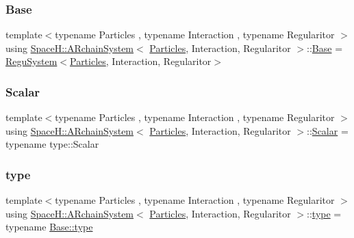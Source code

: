 \subsubsection{\texorpdfstring{Base}{Base}}
{\footnotesize\ttfamily template$<$typename Particles , typename Interaction , typename Regularitor $>$ \\
using \mbox{\hyperlink{class_space_h_1_1_a_rchain_system}{Space\+H\+::\+A\+Rchain\+System}}$<$ \mbox{\hyperlink{struct_space_h_1_1_particles}{Particles}}, Interaction, Regularitor $>$\+::\mbox{\hyperlink{class_space_h_1_1_a_rchain_system_a406ea4f9fd417879ac32c691bb705de4}{Base}} =  \mbox{\hyperlink{class_space_h_1_1_regu_system}{Regu\+System}}$<$\mbox{\hyperlink{struct_space_h_1_1_particles}{Particles}}, Interaction, Regularitor$>$}

\mbox{\label{class_space_h_1_1_a_rchain_system_acaaa03940944dd5d6978c575888dd308}} 
\subsubsection{\texorpdfstring{Scalar}{Scalar}}
{\footnotesize\ttfamily template$<$typename Particles , typename Interaction , typename Regularitor $>$ \\
using \mbox{\hyperlink{class_space_h_1_1_a_rchain_system}{Space\+H\+::\+A\+Rchain\+System}}$<$ \mbox{\hyperlink{struct_space_h_1_1_particles}{Particles}}, Interaction, Regularitor $>$\+::\mbox{\hyperlink{class_space_h_1_1_a_rchain_system_acaaa03940944dd5d6978c575888dd308}{Scalar}} =  typename type\+::\+Scalar}

\mbox{\label{class_space_h_1_1_a_rchain_system_a1830232bc4647fc2ef093696d76db007}} 
\subsubsection{\texorpdfstring{type}{type}}
{\footnotesize\ttfamily template$<$typename Particles , typename Interaction , typename Regularitor $>$ \\
using \mbox{\hyperlink{class_space_h_1_1_a_rchain_system}{Space\+H\+::\+A\+Rchain\+System}}$<$ \mbox{\hyperlink{struct_space_h_1_1_particles}{Particles}}, Interaction, Regularitor $>$\+::\mbox{\hyperlink{class_space_h_1_1_a_rchain_system_a1830232bc4647fc2ef093696d76db007}{type}} =  typename \mbox{\hyperlink{class_space_h_1_1_regu_system_a21376735739dfbe668a70cdba008baa3}{Base\+::type}}}



